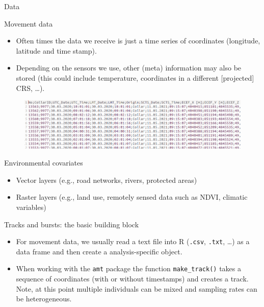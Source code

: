 \documentclass[ignorenonframetext,,t]{beamer}
\providecommand{\tightlist}{%
\setlength{\itemsep}{0pt}\setlength{\parskip}{0pt}}
\providecommand{\tightlist}{%
\setlength{\itemsep}{0pt}\setlength{\parskip}{0pt}}
\renewcommand{\tightlist}{\setlength{\itemsep}{1.4ex}\setlength{\parskip}{0pt}}
\begin{document}
\begin{frame}{Data}
\protect\hypertarget{data}{}
\begin{block}{Movement data}
\protect\hypertarget{movement-data}{}
\begin{itemize}
\tightlist
\item
  Often times the data we receive is just a time series of coordinates
  (longitude, latitude and time stamp).
\item
  Depending on the sensors we use, other (meta) information may also be
  stored (this could include temperature, coordinates in a different
  {[}projected{]} CRS, \ldots).
\end{itemize}

\begin{figure}

{\centering \includegraphics[width=0.85\linewidth]{../img/relocs} 

}

\end{figure}
\end{block}
\end{frame}

\begin{frame}
\begin{block}{Environmental covariates}
\protect\hypertarget{environmental-covariates}{}
\begin{itemize}
\tightlist
\item
  Vector layers (e.g., road networks, rivers, protected areas)
\item
  Raster layers (e.g., land use, remotely sensed data such as NDVI,
  climatic variables)
\end{itemize}
\end{block}
\end{frame}

\begin{frame}[fragile]{Tracks and bursts: the basic building block}
\protect\hypertarget{tracks-and-bursts-the-basic-building-block}{}
\begin{itemize}
\item
  For movement data, we usually read a text file into R (\texttt{.csv},
  \texttt{.txt}, \ldots) as a data frame and then create a
  analysis-specific object.
\item
  When working with the \texttt{amt} package the function
  \texttt{make\_track()} takes a sequence of coordinates (with or
  without timestamps) and creates a track. Note, at this point multiple
  individuals can be mixed and sampling rates can be heterogeneous.
\end{itemize}
\end{frame}
\end{document}
